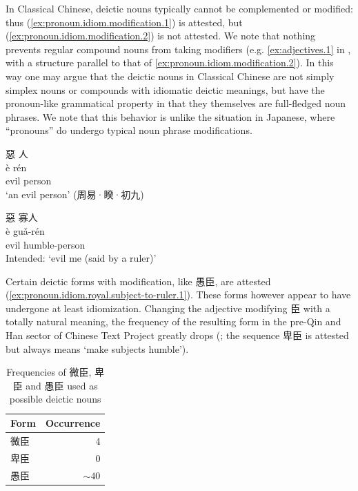 \documentclass[UTF8, a4paper, oneside, scheme=plain, 12pt]{ctexrep}
\newcommand{\translate}[1]{`#1'}
\begin{document}
In Classical Chinese, deictic nouns typically cannot be complemented or modified:
thus (\ref{ex:pronoun.idiom.modification.1}) is attested,
but (\ref{ex:pronoun.idiom.modification.2}) is not attested.
We note that nothing prevents regular compound nouns from taking modifiers (e.g. \ref{ex:adjectives.1} in , with a structure parallel to that of \ref{ex:pronoun.idiom.modification.2}).
In this way one may argue that the deictic nouns in Classical Chinese are not simply simplex nouns or compounds with idiomatic deictic meanings,
but have the pronoun-like grammatical property in that they themselves are full-fledged noun phrases.
We note that this behavior is unlike the situation in Japanese,
where ``pronouns'' do undergo typical noun phrase modifications.

\begin{exe}
    \ex \begin{xlist}
        \ex\label{ex:pronoun.idiom.modification.1}
        \glll 惡 人 \\
        è rén \\
        evil person \\
        \glt\translate{an evil person} \hfill (周易·睽·初九)

        \ex\label{ex:pronoun.idiom.modification.2}
        \glll *惡 寡人 \\
        è guǎ-rén \\
        evil humble-person \\
        \glt Intended: \translate{evil me (said by a ruler)} 
    \end{xlist}
\end{exe}

Certain deictic forms with modification, like 愚臣, are attested (\ref{ex:pronoun.idiom.royal.subject-to-ruler.1}).
These forms however appear to have undergone at least idiomization.
Changing the adjective modifying 臣 with a totally natural meaning,
the frequency of the resulting form in the pre-Qin and Han sector of Chinese Text Project greatly drops (; the sequence 卑臣 is attested but always means \translate{make subjects humble}).

\begin{table}[H]
    \caption{Frequencies of 微臣, 卑臣 and 愚臣 used as possible deictic nouns}
    \label{tbl:chen-frequency}
    \centering
    \begin{tabular}{lr}
        \toprule
        Form & Occurrence \\
        \midrule
        微臣 & 4 \\
        卑臣 & 0 \\
        愚臣 & $\sim 40$ \\
        \bottomrule
    \end{tabular}
\end{table}
\end{document}
